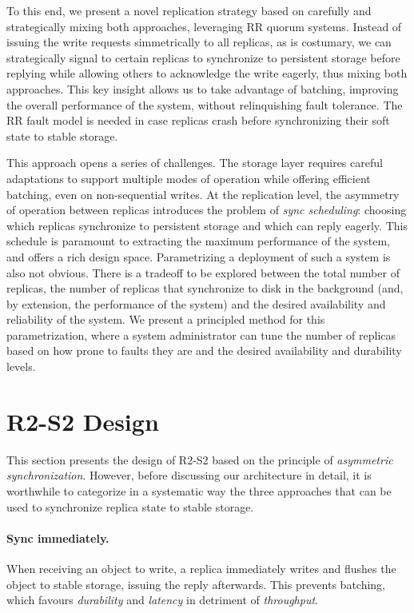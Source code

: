 To this end, we present a novel replication strategy based on
carefully and strategically mixing both approaches, leveraging
\ac{RR} quorum systems. Instead of issuing the write
requests simmetrically to all replicas, as is costumary, we can
strategically signal to certain replicas to synchronize to
persistent storage before replying while allowing others to
acknowledge the write eagerly, thus mixing both approaches. This
key insight allows us to take advantage of batching, improving the overall
performance of the system, without relinquishing fault tolerance.
The \ac{RR} fault model is needed in case replicas crash before
synchronizing their soft state to stable storage.

This approach opens a series of challenges. The storage layer
requires careful adaptations to support multiple modes of
operation while offering efficient batching, even on
non-sequential writes. At the replication level, the asymmetry of
operation between replicas introduces the problem of \emph{sync
scheduling}: choosing which replicas synchronize to persistent storage
and which can reply eagerly. This schedule is paramount to
extracting the maximum performance of the system, and offers a
rich design space. Parametrizing a deployment of such a system is
also not obvious. There is a tradeoff to be explored between the
total number of replicas, the number of replicas that synchronize
to disk in the background (and, by extension, the performance of
the system) and the desired availability and reliability of the
system. We present a principled method for this parametrization,
where a system administrator can tune the number of replicas
based on how prone to faults they are and the desired
availability and durability levels.

\section{\ac{R2-S2} Design}\label{sec:r2s2design}

This section presents the design of \ac{R2-S2}
based on the principle of \emph{asymmetric synchronization}. However,
before discussing our architecture in detail, it is worthwhile to
categorize in a systematic way the three approaches that can be used to synchronize
replica state to stable storage.

\paragraph{Sync immediately.} When receiving an object to write, a
replica immediately writes and flushes the object to stable
storage, issuing the reply afterwards. This prevents batching,
which favours \emph{durability} and \emph{latency} in detriment
of \emph{throughput}.

